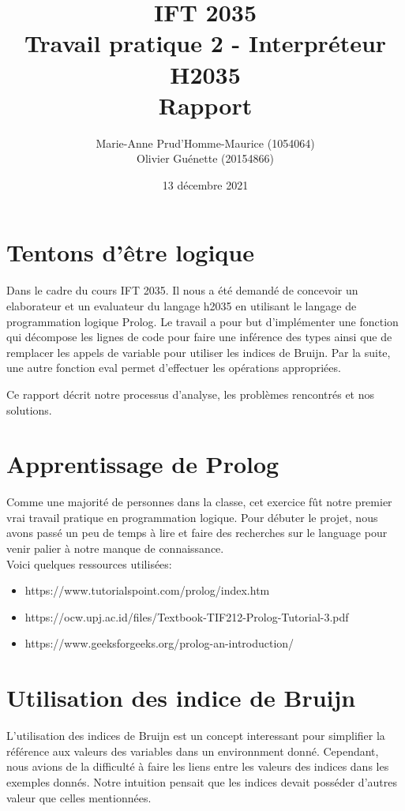 \documentclass[12pt, letterpaper]{article}
\title{IFT 2035 \\ Travail pratique 2 - Interpréteur H2035 \\ Rapport }
\author{ Marie-Anne Prud'Homme-Maurice (1054064) 
\\ Olivier Guénette (20154866)}
\date{13 décembre 2021}
\begin{document}
\maketitle

\section*{Tentons d'être logique} 

Dans le cadre du cours IFT 2035. Il nous a été demandé de concevoir un 
elaborateur et un evaluateur du langage h2035 en utilisant le langage 
de programmation logique Prolog. Le travail a pour but d'implémenter une 
fonction qui décompose les lignes de code pour faire une inférence des types
ainsi que de remplacer les appels de variable pour utiliser les indices de 
Bruijn. Par la suite, une autre fonction eval permet d'effectuer les opérations 
appropriées.

Ce rapport décrit notre processus d'analyse, les problèmes rencontrés et nos
solutions.

\section*{Apprentissage de Prolog}

Comme une majorité de personnes dans la classe, cet exercice fût notre premier
vrai travail pratique en programmation logique. Pour débuter le projet, nous 
avons passé un peu de temps à lire et faire des recherches sur le language 
pour venir palier à notre manque de connaissance.\\

Voici quelques ressources utilisées: 
\begin{itemize}
    \item https://www.tutorialspoint.com/prolog/index.htm
    \item https://ocw.upj.ac.id/files/Textbook-TIF212-Prolog-Tutorial-3.pdf
    \item https://www.geeksforgeeks.org/prolog-an-introduction/
\end{itemize}

\section*{Utilisation des indice de Bruijn}

L'utilisation des indices de Bruijn est un concept interessant pour simplifier
la référence aux valeurs des variables dans un environnment donné. Cependant, 
nous avions de la difficulté à faire les liens entre les valeurs des indices 
dans les exemples donnés. Notre intuition pensait que les indices devait 
posséder d'autres valeur que celles mentionnées.
\end{document}
